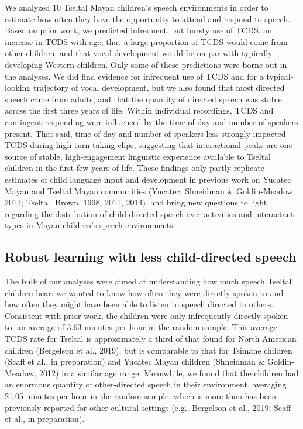 \documentclass[floatsintext,man]{apa6}
\theoremstyle{definition}
\theoremstyle{definition}
\theoremstyle{definition}
\theoremstyle{remark}
\begin{document}
We analyzed 10 Tseltal Mayan children's speech environments in order to
estimate how often they have the opportunity to attend and respond to
speech. Based on prior work, we predicted infrequent, but bursty use of
TCDS, an increase in TCDS with age, that a large proportion of TCDS
would come from other children, and that vocal development would be on
par with typically developing Western children. Only some of these
predictions were borne out in the analyses. We did find evidence for
infrequent use of TCDS and for a typical-looking trajectory of vocal
development, but we also found that most directed speech came from
adults, and that the quantity of directed speech was stable across the
first three years of life. Within individual recordings, TCDS and
contingent responding were influenced by the time of day and number of
speakers present. That said, time of day and number of speakers less
strongly impacted TCDS during high turn-taking clips, suggesting that
interactional peaks are one source of stable, high-engagement linguistic
experience available to Tseltal children in the first few years of life.
These findings only partly replicate estimates of child language input
and development in previous work on Yucatec Mayan and Tseltal Mayan
communities (Yucatec: Shneidman \& Goldin-Meadow 2012; Tseltal: Brown,
1998, 2011, 2014), and bring new questions to light regarding the
distribution of child-directed speech over activities and interactant
types in Mayan children's speech environments.

\subsection{Robust learning with less child-directed
speech}\label{robust-learning-with-less-child-directed-speech}

The bulk of our analyses were aimed at understanding how much speech
Tseltal children hear: we wanted to know how often they were directly
spoken to and how often they might have been able to listen to speech
directed to others. Consistent with prior work, the children were only
infrequently directly spoken to: an average of 3.63 minutes per hour in
the random sample. This average TCDS rate for Tseltal is approximately a
third of that found for North American children (Bergelson et al.,
2019), but is comparable to that for Tsimane children (Scaff et al., in
preparation) and Yucatec Mayan children (Shneidman \& Goldin-Meadow,
2012) in a similar age range. Meanwhile, we found that the children had
an enormous quantity of other-directed speech in their environment,
averaging 21.05 minutes per hour in the random sample, which is more
than has been previously reported for other cultural settings (e.g.,
Bergelson et al., 2019; Scaff et al., in preparation).
\end{document}
